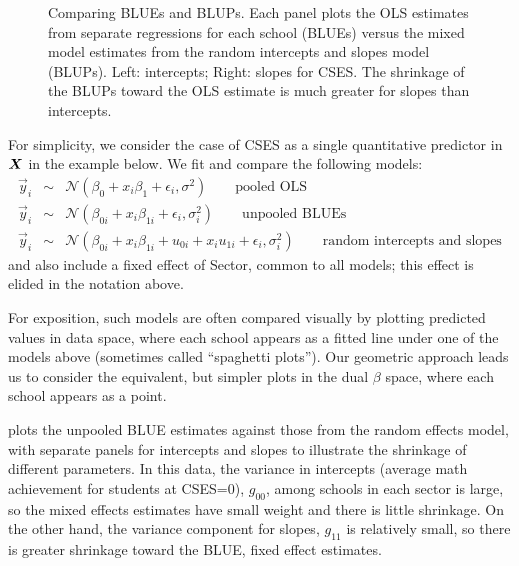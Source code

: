 \begin{figure}[htb]
\begin{minipage}[b]{.49\linewidth}
 \end{minipage}
  \caption{Comparing BLUEs and BLUPs. Each panel plots the OLS estimates from separate regressions for each school (BLUEs)
  versus the mixed model estimates from the random intercepts and slopes model (BLUPs).
  Left: intercepts; Right: slopes for CSES.  The shrinkage of the BLUPs toward the OLS estimate is much greater for slopes than
  intercepts. }
  \label{fig:hsbmix4}
\end{figure}

For simplicity, we consider the case of CSES as
a single quantitative predictor in $\bm{X}$ in the example below.  We fit and compare the following models:
\begin{eqnarray}
 \vec{y}_{i} & \sim & \mathcal{N} ( \beta_0 + x_{i} \beta_1 + \epsilon_{i}  , \sigma^2 ) \quad\quad \textrm{pooled OLS} \\
 \vec{y}_{i} & \sim & \mathcal{N} ( \beta_{0i} + x_{i} \beta_{1i} + \epsilon_{i}  , \sigma^2_i ) \quad\quad \textrm{unpooled BLUEs} \\
 \vec{y}_{i} & \sim & \mathcal{N} ( \beta_{0i} + x_{i} \beta_{1i} + u_{0i} + x_{i} u_{1i} + \epsilon_{i}  , \sigma^2_i ) \quad\quad \textrm{random intercepts and slopes} 
%
\end{eqnarray}
and also include a fixed effect of Sector, common to all models; this effect is elided in the notation above.

For exposition, such models are often compared visually by plotting predicted values in data space, where each school appears
as a fitted line under one of the models above (sometimes called ``spaghetti plots'').
Our geometric approach leads us to consider the equivalent, but simpler plots in the dual $\beta$ space,
where each school appears as a point.

 plots the unpooled BLUE estimates against those from the random effects model, with separate panels for intercepts
and slopes to illustrate the shrinkage of different parameters.  In this data, the variance in intercepts (average math achievement
for students at CSES=0), $g_{00}$,
among schools in each sector is large, so the mixed effects estimates have small weight and there is little
shrinkage.  On the other hand, the variance component for slopes, $g_{11}$ is relatively small, so there is greater
shrinkage toward the BLUE, fixed effect estimates.


